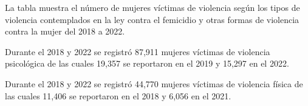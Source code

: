 La tabla muestra el número de mujeres víctimas de violencia según los tipos de violencia contemplados en la ley contra el femicidio y otras formas de violencia contra la mujer del 2018 a 2022. 

Durante el 2018 y 2022 se registró 87,911 mujeres víctimas de violencia psicológica de las cuales 19,357 se reportaron en el 2019 y 15,297 en el 2022. 

Durante el 2018 y 2022 se registró 44,770 mujeres víctimas de violencia física de las cuales 11,406 se reportaron en el 2018 y 6,056 en el 2021. 
